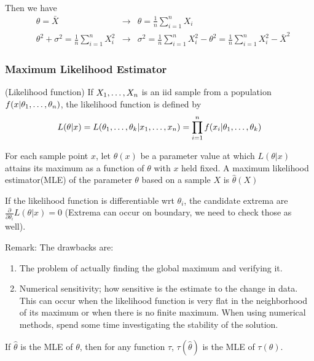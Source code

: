 \documentclass[12pt]{article}
\begin{document}
Then we have \begin{align*}
  &\theta = \bar{X} &\rightarrow &\theta = \frac{1}{n}\sum^n_{i=1}X_i  \\
  &\theta^2 + \sigma^2 =  \frac{1}{n} \sum^n_{i=1}X_i^2 
  &\rightarrow &\sigma^2 = \frac{1}{n} \sum^n_{i=1}X_i^2 - \theta^2  = \frac{1}{n} \sum^n_{i=1}X_i^2 - \bar{X}^2
\end{align*}

\subsubsection{Maximum Likelihood Estimator}
\begin{definition}(Likelihood function)
	If $\varvec{X}$ is an iid sample from a population $f(x|\varvec{\theta})$, the likelihood function is defined by $$
	 L(\theta|x) = L(\varvec[k]{\theta} | \varvec{x}) = \prod^n_{i=1} f(x_i | \varvec[k]{\theta})
	$$
\end{definition}

\begin{definition}
	For each sample point $x$, let $\hat{\theta}(x)$ be a parameter value at which $L(\theta| x)$ attains its maximum as a function of $\theta$ with $x$ held fixed. A maximum likelihood estimator(MLE) of the parameter $\theta$ based on a sample $X$ is $\hat{\theta}(X)$
\end{definition}

If the likelihood function is differentiable wrt $\theta_i$, the candidate extrema are $\frac{\partial}{\partial \theta_i}L(\theta |x) = 0$ (Extrema can occur on boundary, we need to check those as well).

Remark: The drawbacks are: \begin{enumerate}
	\item The problem of actually finding the global maximum and verifying it.
	\item Numerical sensitivity; how sensitive is the estimate to the change in data. This can occur when the likelihood function is very flat in the neighborhood of its maximum or when there is no finite maximum. When using numerical methods, spend some time investigating the stability of the solution.
\end{enumerate}

\begin{theorem}
	If $\hat{\theta}$ is the MLE of $\theta$, then for any function $\tau$, $\tau(\hat{\theta})$ is the MLE of $\tau(\theta)$.
\end{theorem}
\end{document}
